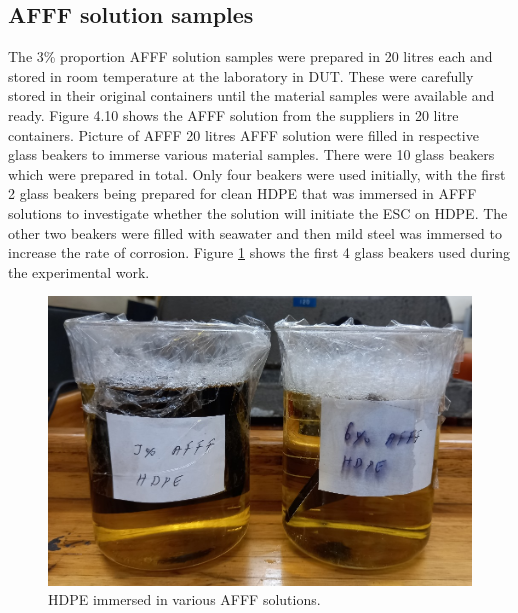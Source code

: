\documentclass[12pt]{report}
\begin{document}
\subsection{AFFF solution samples}
The 3\% proportion AFFF solution samples were prepared in 20 litres each and stored in room temperature at the laboratory in DUT. These were carefully stored in their original containers until the material samples were available and ready. Figure 4.10 shows the AFFF solution from the suppliers in 20 litre containers.
Picture of AFFF 20 litres
AFFF solution were filled in respective glass beakers to immerse various material samples. There were 10 glass beakers which were prepared in total. Only four beakers were used initially, with the first 2 glass beakers being prepared for clean HDPE that was immersed in AFFF solutions to investigate whether the solution will initiate the ESC on HDPE. The other two beakers were filled with seawater and then mild steel was immersed to increase the rate of corrosion. Figure \ref{ch4:figure:hdpe_immersed} shows the first 4 glass beakers used during the experimental work.
 
\begin{figure}[H]
    \centering
    \includegraphics[width=.5\textwidth]{hdpe_immersed_in_various_afff_solutions.jpg}
    \caption{HDPE immersed in various AFFF solutions.}
    \label{ch4:figure:hdpe_immersed}
\end{figure}
 
\end{document}
